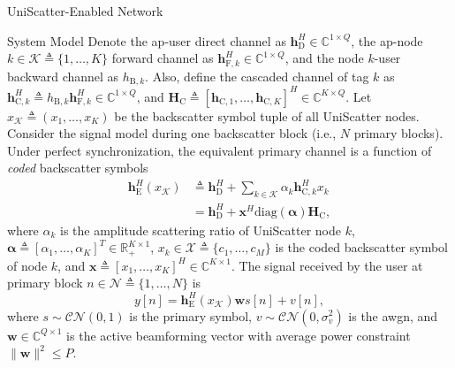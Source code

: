 \documentclass[journal]{IEEEtran}
\begin{document}
\begin{section}{UniScatter-Enabled Network}
\begin{subsection}{System Model}
		Denote the \gls{ap}-user direct channel as $\boldsymbol{h}_{\mathrm{D}}^H \in \mathbb{C}^{1 \times Q}$, the \gls{ap}-node $k \in \mathcal{K} \triangleq \{1,\ldots,K\}$ forward channel as $\boldsymbol{h}_{\mathrm{F},k}^H \in \mathbb{C}^{1 \times Q}$, and the node $k$-user backward channel as $h_{\mathrm{B},k}$. Also, define the cascaded channel of tag $k$ as $\boldsymbol{h}_{\mathrm{C},k}^H \triangleq h_{\mathrm{B},k} \boldsymbol{h}_{\mathrm{F},k}^H \in \mathbb{C}^{1 \times Q}$, and $\boldsymbol{H}_{\mathrm{C}} \triangleq [\boldsymbol{h}_{\mathrm{C},1},\ldots,\boldsymbol{h}_{\mathrm{C},K}]^H \in \mathbb{C}^{K \times Q}$.
		Let $x_{\mathcal{K}} \triangleq (x_1,\ldots,x_K)$ be the backscatter symbol tuple of all UniScatter nodes.
		Consider the signal model during one backscatter block (i.e., $N$ primary blocks).
		Under perfect synchronization, the equivalent primary channel is a function of \emph{coded} backscatter symbols
		\begin{subequations}
			\label{eq:equivalent_channel}
			\begin{align}
				\boldsymbol{h}_{\mathrm{E}}^H(x_{\mathcal{K}})
				 & \triangleq \boldsymbol{h}_{\mathrm{D}}^H + \sum_{k \in \mathcal{K}} \alpha_k \boldsymbol{h}_{\mathrm{C},k}^H x_k   \\
				 & = \boldsymbol{h}_{\mathrm{D}}^H + \boldsymbol{x}^H \mathrm{diag}(\boldsymbol{\alpha}) \boldsymbol{H}_{\mathrm{C}},
			\end{align}
		\end{subequations}
		where $\alpha_k$ is the amplitude scattering ratio of UniScatter node $k$, $\boldsymbol{\alpha} \triangleq [\alpha_1,\ldots,\alpha_K]^T \in \mathbb{R}_+^{K \times 1}$, $x_k \in \mathcal{X} \triangleq \{c_1,\ldots,c_M\}$ is the coded backscatter symbol of node $k$, and $\boldsymbol{x} \triangleq [x_1,\ldots,x_K]^H \in \mathbb{C}^{K \times 1}$. The signal received by the user at primary block $n \in \mathcal{N} \triangleq \{1,\ldots,N\}$ is
		\begin{equation}
			y[n] = \boldsymbol{h}_{\mathrm{E}}^H(x_{\mathcal{K}}) \boldsymbol{w} s[n] + v[n],
		\end{equation}
		where $s \sim \mathcal{CN}(0,1)$ is the primary symbol, $v \sim \mathcal{CN}(0,\sigma_v^2)$ is the \gls{awgn}, and $\boldsymbol{w} \in \mathbb{C}^{Q \times 1}$ is the active beamforming vector with average power constraint $\lVert \boldsymbol{w} \rVert^2 \le P$.

\end{subsection}
\end{section}
\end{document}
